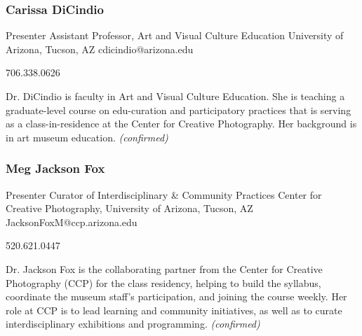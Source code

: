 \documentclass{report}
\begin{document}
              

              
                \subsubsection*{ Carissa DiCindio }
                Presenter\newline
                Assistant Professor, Art and Visual Culture Education\newline
                University of Arizona, Tucson, AZ
                \newline
                cdicindio@arizona.edu\newline
                
                706.338.0626\newline

                Dr. DiCindio is faculty in Art and Visual Culture Education. She is teaching a graduate-level course on edu-curation and participatory practices that is serving as a class-in-residence at the Center for Creative Photography. Her background is in art museum education.
                \emph{ (confirmed) }
              

              
                \subsubsection*{ Meg Jackson Fox }
                Presenter\newline
                Curator of Interdisciplinary \& Community Practices\newline
                Center for Creative Photography, University of Arizona, Tucson, AZ
                \newline
                JacksonFoxM@ccp.arizona.edu\newline
                
                520.621.0447\newline

                Dr. Jackson Fox is the collaborating partner from the Center for Creative Photography (CCP) for the class residency, helping to build the syllabus, coordinate the museum staff’s participation, and joining the course weekly. Her role at CCP is to lead learning and community initiatives, as well as to curate interdisciplinary exhibitions and programming.
                \emph{ (confirmed) }
              
\end{document}
